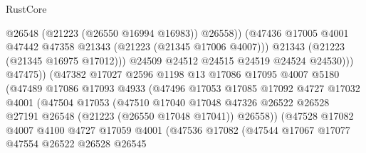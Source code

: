 \begin{lexlean}{RustCore}
\begin{coremodule}
                                      @26548
                                      (@21223 (@26550 @16994 @16983))
                                      @26558))
                                  (@47436
                                    @17005
                                    @4001
                                    @47442
                                    @47358
                                    @21343
                                    (@21223 (@21345 @17006 @4007)))
                                  @21343
                                  (@21223 (@21345 @16975 @17012)))
                                @24509
                                @24512
                                @24515
                                @24519
                                @24524
                                @24530)))
                          @47475))
                      (@47382
                        @17027
                        @2596
                        @1198
                        @13
                        @17086
                        @17095
                        @4007
                        @5180
                        (@47489
                          @17086
                          @17093
                          @4933
                          (@47496
                            @17053
                            @17085
                            @17092
                            @4727
                            @17032
                            @4001
                            (@47504
                              @17053
                              (@47510
                                @17040
                                @17048
                                @47326
                                @26522
                                @26528
                                @27191
                                @26548
                                (@21223 (@26550 @17048 @17041))
                                @26558))
                            (@47528
                              @17082
                              @4007
                              @4100
                              @4727
                              @17059
                              @4001
                              (@47536
                                @17082
                                (@47544
                                  @17067
                                  @17077
                                  @47554
                                  @26522
                                  @26528
                                  @26545

\end{coremodule}
\end{lexlean}
